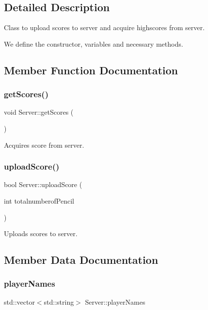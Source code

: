 \subsection{Detailed Description}
Class to upload scores to server and acquire highscores from server. 

We define the constructor, variables and necessary methods. 

\subsection{Member Function Documentation}
\mbox{\label{classServer_ad8a93d69ede1b02b2ef9ff6bd31a325a}} 
\subsubsection{\texorpdfstring{get\+Scores()}{getScores()}}
{\footnotesize\ttfamily void Server\+::get\+Scores (\begin{DoxyParamCaption}{ }\end{DoxyParamCaption})}

Acquires score from server. \mbox{\label{classServer_a1675e8a33c0e4f9f2d51d3de16981e66}} 
\subsubsection{\texorpdfstring{upload\+Score()}{uploadScore()}}
{\footnotesize\ttfamily bool Server\+::upload\+Score (\begin{DoxyParamCaption}\item[{int}]{totalnumberof\+Pencil }\end{DoxyParamCaption})}

Uploads scores to server. 

\subsection{Member Data Documentation}
\mbox{\label{classServer_a814400b9c0b97860b692a608fffa0115}} 
\subsubsection{\texorpdfstring{player\+Names}{playerNames}}
{\footnotesize\ttfamily std\+::vector$<$std\+::string$>$ Server\+::player\+Names}

